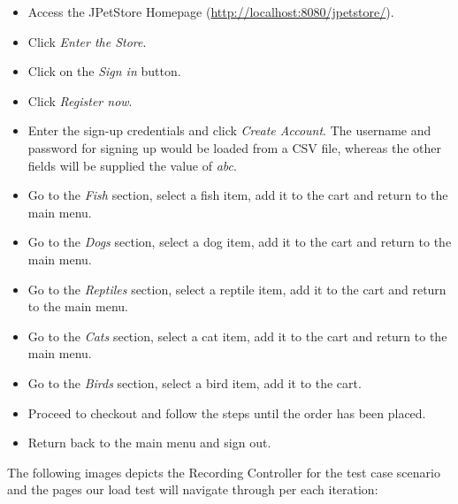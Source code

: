 \documentclass[fontsize=12pt,paper=letter,twoside]{scrartcl}
\begin{document}
\begin{itemize}
\item Access the JPetStore Homepage (\url{http://localhost:8080/jpetstore/}).
\item Click \emph{Enter the Store}.
\item Click on the \emph{Sign in} button.
\item Click \emph{Register now}.
\item Enter the sign-up credentials and click \emph{Create Account}. The username and password for signing up would be loaded from a CSV file, whereas the other fields will be supplied the value of \emph{abc}.
\item Go to the \emph{Fish} section, select a fish item, add it to the cart and return to the main menu.
\item Go to the \emph{Dogs} section, select a dog item, add it to the cart and return to the main menu.
\item Go to the \emph{Reptiles} section, select a reptile item, add it to the cart and return to the main menu.
\item Go to the \emph{Cats} section, select a cat item, add it to the cart and return to the main menu.
\item Go to the \emph{Birds} section, select a bird item, add it to the cart.
\item Proceed to checkout and follow the steps until the order has been placed.
\item Return back to the main menu and sign out.
\end{itemize}

\newpage
\bigskip
\noindent The following images depicts the Recording Controller for the test case scenario and the pages our load test will navigate through per each iteration:
\end{document}
